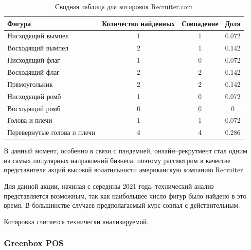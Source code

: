 \documentclass[bachelor, och, coursework]{SCWorks}
\begin{document}
    \begin{table}[!hbt]
        \centering
        \begin{tabular}{|l|c|c|c|}
        \hline
        Фигура                      & \multicolumn{1}{l|}{Количество найденных} & Совпадение & Доля  \\ \hline
        Нисходящий вымпел           & 1                                         & 1          & 0.072 \\ \hline
        Восходящий вымпел           & 2                                         & 1          & 0.142 \\ \hline
        Нисходящий флаг             & 1                                         & 0          & 0.072 \\ \hline
        Восходящий флаг             & 2                                         & 2          & 0.142 \\ \hline
        Прямоугольник               & 2                                         & 2          & 0.142 \\ \hline
        Нисходящий ромб             & 1                                         & 0          & 0.072 \\ \hline
        Восходящий ромб             & 0                                         & 0          & 0     \\ \hline
        Голова и плечи              & 1                                         & 1          & 0.072 \\ \hline
        Перевернутые голова и плечи & 4                                         & 4          & 0.286 \\ \hline
        \end{tabular}
        \captionsetup{justification=centering}
        \caption{Сводная таблица для котировок Recruiter.com}      
    \end{table}

    В данный момент, особенно в связи с пандемией, онлайн--рекрутмент стал одним
    из самых популярных направлений бизнеса, поэтому рассмотрим в качестве
    представителя акций высокой волатильности американскую компанию Recruiter.

    Для данной акции, начиная с середины 2021 года, технический анализ
    представляется возможным, так как наибольшее число фигур было найдено в это
    время. В большинстве случаев предполагаемый курс совпал с действительным.
    
    Котировка считается технически анализируемой.

    \subsubsection{Greenbox POS}
    
\end{document}
